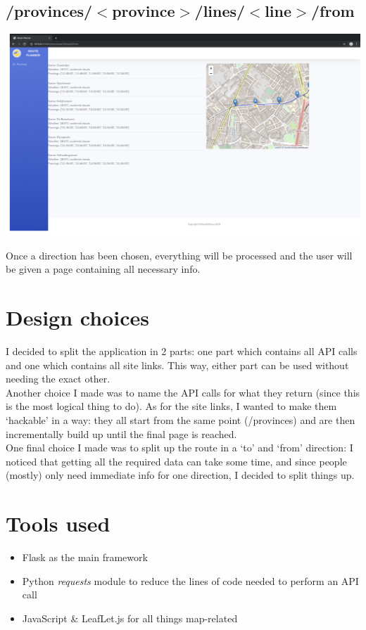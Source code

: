 \documentclass[12pt]{article}
\begin{document}
\subsection{/provinces/$<$province$>$/lines/$<$line$>$/from}
\begin{center}
	\includegraphics[width=\linewidth]{images/Route_from.png}
\end{center}
Once a direction has been chosen, everything will be processed and  the user will be given a page containing all necessary info.

\newpage

\section{Design choices}
I decided to split the application in 2 parts: one part which contains all API calls and one which contains all site links. This way, either part can be used without needing the exact other.\\
Another choice I made was to name the API calls for what they return (since this is the most logical thing to do). As for the site links, I wanted to make them `hackable' in a way: they all start from the same point (/provinces) and are then incrementally build up until the final page is reached. \\
One final choice I made was to split up the route in a `to' and `from' direction: I noticed that getting all the required data can take some time, and since people (mostly) only need immediate info for one direction, I decided to split things up.

\section{Tools used}
\begin{itemize}
	\item Flask as the main framework
	\item Python \emph{requests} module to reduce the lines of code needed to perform an API call
	\item JavaScript \& LeafLet.js for all things map-related

\end{itemize}
\end{document}

